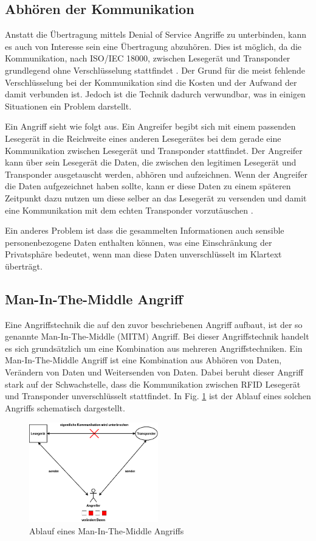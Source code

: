 \documentclass[conference]{IEEEtran}
\begin{document}
\subsection{Abhören der Kommunikation}
Anstatt die Übertragung mittels Denial of Service Angriffe zu unterbinden, kann es auch von Interesse sein eine Übertragung abzuhören. Dies ist möglich, da die Kommunikation, nach ISO/IEC 18000, zwischen Lesegerät und Transponder grundlegend ohne Verschlüsselung stattfindet \cite{b3}. Der Grund für die meist fehlende Verschlüsselung bei der Kommunikation sind die Kosten und der Aufwand der damit verbunden ist. Jedoch ist die Technik dadurch verwundbar, was in einigen Situationen ein Problem darstellt.

Ein Angriff sieht wie folgt aus. Ein Angreifer begibt sich mit einem passenden Lesegerät in die Reichweite eines anderen Lesegerätes bei dem gerade eine Kommunikation zwischen Lesegerät und Transponder stattfindet. Der Angreifer kann über sein Lesegerät die Daten, die zwischen den legitimen Lesegerät und Transponder ausgetauscht werden, abhören und aufzeichnen. Wenn der Angreifer die Daten aufgezeichnet haben sollte, kann er diese Daten zu einem späteren Zeitpunkt dazu nutzen um diese selber an das Lesegerät zu versenden und damit eine Kommunikation mit dem echten Transponder vorzutäuschen \cite{b8}. 

Ein anderes Problem ist dass die gesammelten Informationen auch sensible personenbezogene Daten enthalten können, was eine Einschränkung der Privatsphäre bedeutet, wenn man diese Daten unverschlüsselt im Klartext überträgt.

\subsection{Man-In-The-Middle Angriff}
Eine Angriffstechnik die auf den zuvor beschriebenen Angriff aufbaut, ist der so genannte Man-In-The-Middle (MITM) Angriff. Bei dieser Angriffstechnik handelt es sich grundsätzlich um eine Kombination aus mehreren Angriffstechniken. Ein Man-In-The-Middle Angriff ist eine Kombination aus Abhören von Daten, Verändern von Daten und Weitersenden von Daten. Dabei beruht dieser Angriff stark auf der Schwachstelle, dass die Kommunikation zwischen RFID Lesegerät und Transponder unverschlüsselt stattfindet. In Fig. \ref{fig3} ist der Ablauf eines solchen Angriffs schematisch dargestellt.

\begin{figure}[htbp]
\centerline{\includegraphics[width=0.5\textwidth]{img/MITM.png}}
\caption{Ablauf eines Man-In-The-Middle Angriffs}
\label{fig3}
\end{figure}
\end{document}
